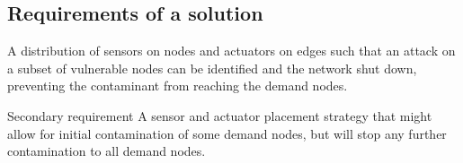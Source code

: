 \documentclass[authoryear,preprint,review,12pt]{elsarticle}
\begin{document}
\subsection{Requirements of a solution}
A distribution of sensors on nodes and actuators on edges such
that an attack on a subset of vulnerable nodes can be identified and
the network shut down, preventing the contaminant
from reaching the demand nodes.

Secondary requirement %
A sensor and actuator placement strategy that might allow for initial
contamination of some demand nodes, but will stop any further contamination
to all demand nodes.




%
%
%
%


%
%
%
\end{document}
